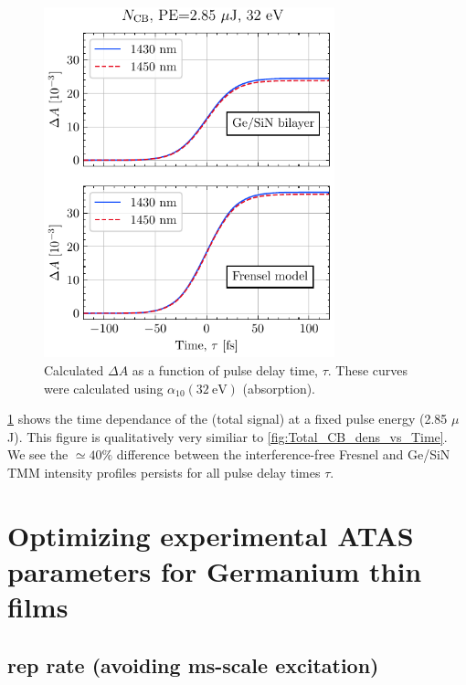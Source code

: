 \begin{figure}
	\centering
	\includegraphics[width=0.75\textwidth]{figures/chap4/FVA_Total_CB_dens_vs_T.pdf}
	\caption{Calculated $\Delta A$ as a function of pulse delay time, $\tau$. These curves were calculated using $\alpha_{10}(32 \ \textrm{eV})$ (absorption).}
	\label{fig:FVA_Total_CB_dens_vs_T}
\end{figure}

\cref{fig:FVA_Total_CB_dens_vs_T} shows the time dependance of the (total signal) at a fixed pulse energy (2.85 $\mu$J). This figure is qualitatively very similiar to \cref{fig:Total_CB_dens_vs_Time}. We see the $\simeq 40\%$ difference between the interference-free Fresnel and Ge/SiN TMM intensity profiles persists for all pulse delay times $\tau$.

\section{Optimizing experimental ATAS parameters for Germanium thin films}

\subsection{rep rate (avoiding ms-scale excitation)}

